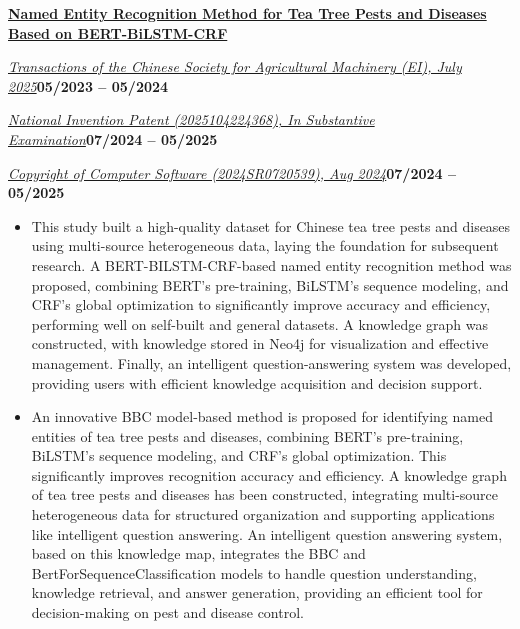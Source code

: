 \documentclass[10pt,a4paper]{article}
\newcommand{\titleline}[1]{\par\vspace{0.80bp}\noindent\textbf{#1}\par\vspace{0.50bp}}
\newcommand{\metaline}[2]{%
  \par\noindent\uline{\textit{#1}}\hfill\textbf{#2}\par\vspace{0.50bp}%
}
\let\venueline\metaline
\newenvironment{cvitems}{%
  \begin{itemize}[leftmargin=14.20bp,labelwidth=4.20bp,labelsep=10.00bp,align=left,
    topsep=0bp,itemsep=0bp,parsep=0bp,partopsep=0bp,label={\textbullet}]
}{\end{itemize}}
\begin{document}
\titleline{\href{https://www.j-csam.org/jcsam/article/abstract/20251150?st=article_issue}{Named Entity Recognition Method for Tea Tree Pests and Diseases Based on BERT-BiLSTM-CRF}}
\venueline{Transactions of the Chinese Society for Agricultural Machinery (EI), July 2025}{05/2023 -- 05/2024}
\venueline{National Invention Patent (2025104224368), In Substantive Examination}{07/2024 -- 05/2025}
\venueline{Copyright of Computer Software (2024SR0720539), Aug 2024}{07/2024 -- 05/2025}
\begin{cvitems}
\item This study built a high-quality dataset for Chinese tea tree pests and diseases using multi-source heterogeneous data, laying the foundation for subsequent research. A BERT-BILSTM-CRF-based named entity recognition method was proposed, combining BERT's pre-training, BiLSTM's sequence modeling, and CRF's global optimization to significantly improve accuracy and efficiency, performing well on self-built and general datasets. A knowledge graph was constructed, with knowledge stored in Neo4j for visualization and effective management. Finally, an intelligent question-answering system was developed, providing users with efficient knowledge acquisition and decision support.
\item An innovative BBC model-based method is proposed for identifying named entities of tea tree pests and diseases, combining BERT's pre-training, BiLSTM's sequence modeling, and CRF's global optimization. This significantly improves recognition accuracy and efficiency. A knowledge graph of tea tree pests and diseases has been constructed, integrating multi-source heterogeneous data for structured organization and supporting applications like intelligent question answering. An intelligent question answering system, based on this knowledge map, integrates the BBC and BertForSequenceClassification models to handle question understanding, knowledge retrieval, and answer generation, providing an efficient tool for decision-making on pest and disease control.
\end{cvitems}
\end{document}
